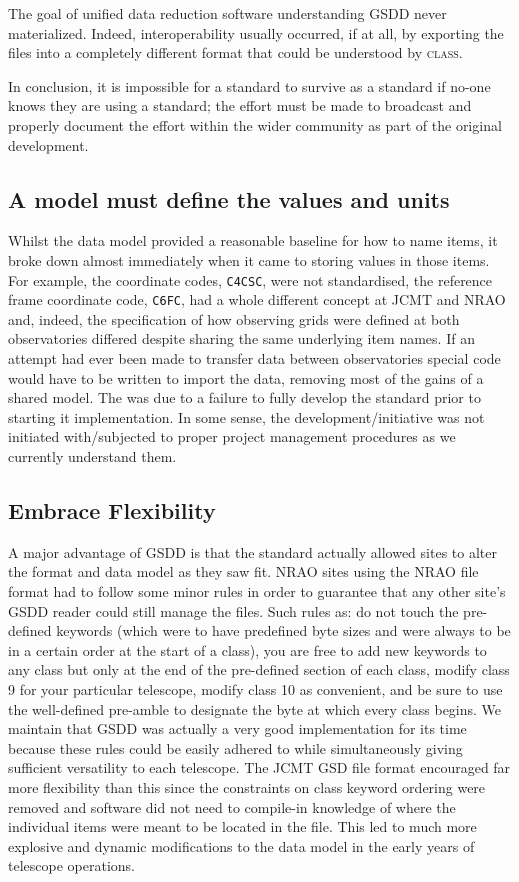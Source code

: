 \documentclass[final,authoryear,5p,times,twocolumn]{elsarticle}
\begin{document}
The goal of unified data reduction software understanding GSDD never
materialized. Indeed, interoperability usually occurred, if at all, by exporting
the files into a completely different format that could be understood
by \textsc{class}.

In conclusion, it is impossible for a standard to survive as a standard
if no-one knows they are using a standard; the effort must be made
to broadcast and properly document the effort within the wider
community as part of the original development.

\subsection{A model must define the values and units}

Whilst the data model provided a reasonable baseline for how to name
items, it broke down almost immediately when it came to storing values
in those items. For example, the coordinate codes, \texttt{C4CSC},
were not standardised, the reference frame coordinate code,
\texttt{C6FC}, had a whole different concept at JCMT and NRAO and,
indeed, the specification of how observing grids were defined at both
observatories differed despite sharing the same underlying item
names. If an attempt had ever been made to transfer data between
observatories special code would have to be written to import the
data, removing most of the gains of a shared model.
The was due to a failure to fully develop the standard prior to
starting it implementation. In some sense, the development/initiative
was not initiated with/subjected to proper project management
procedures as we currently understand them.

\subsection{Embrace Flexibility}

A major advantage of GSDD is that the standard actually allowed sites
to alter the format and data model as they saw fit.
NRAO sites using the NRAO file format had to follow some minor rules in order to
guarantee that any other site's GSDD reader could still manage the
files.  Such rules as: do not touch the pre-defined keywords (which
were to have predefined byte sizes and were always to be in a certain
order at the start of a class), you are free to add new keywords to
any class but only at the end of the pre-defined section of each
class, modify class 9 for your particular telescope, modify class 10
as convenient, and be sure to use the well-defined pre-amble to
designate the byte at which every class begins.  We maintain that GSDD
was actually a very good implementation for its time because these
rules could be easily adhered to while simultaneously giving
sufficient versatility to each telescope. The JCMT GSD file format
encouraged far more flexibility than this since the constraints on
class keyword ordering were removed and software did not need to
compile-in knowledge of where the individual items were meant to be
located in the file. This led to much more explosive and
dynamic modifications to the data model in the early years of
telescope operations.
\end{document}

